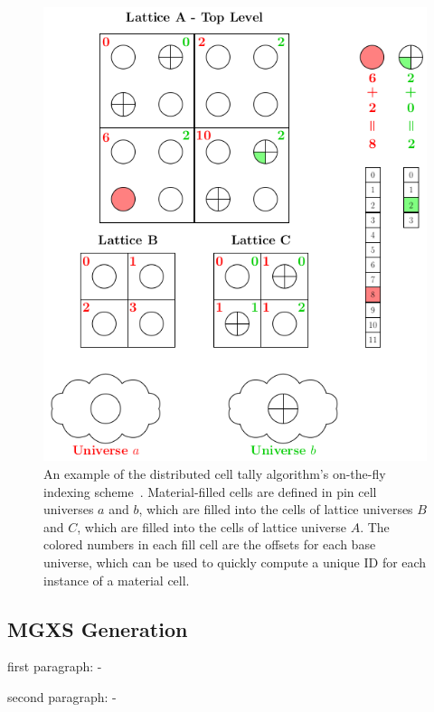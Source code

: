 \begin{figure}
  \centering
  \includegraphics[width=\linewidth]{figures/workflow/openmc/distribcells}
\caption[The distributed cell tally indexing algorithm]{An example of the distributed cell tally algorithm's on-the-fly indexing scheme~\cite{lax2014distribcell}. Material-filled cells are defined in pin cell universes $a$ and $b$, which are filled into the cells of lattice universes $B$ and $C$, which are filled into the cells of lattice universe $A$.  The colored numbers in each fill cell are the offsets for each base universe, which can be used to quickly compute a unique ID for each instance of a material cell.}
\label{fig:indexing-scheme}
\end{figure}

\subsection{MGXS Generation}
\label{sec:chap3-mgxs}

first paragraph:
-

second paragraph:
-

